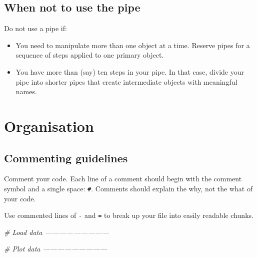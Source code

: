 \documentclass[]{book}
\newenvironment{Shaded}{\begin{snugshade}}{\end{snugshade}}
\newcommand{\CommentTok}[1]{\textcolor[rgb]{0.56,0.35,0.01}{\textit{{#1}}}}
\begin{document}
\section{When not to use the pipe}\label{when-not-to-use-the-pipe}

Do not use a pipe if:

\begin{itemize}
\item
  You need to manipulate more than one object at a time. Reserve pipes
  for a sequence of steps applied to one primary object.
\item
  You have more than (say) ten steps in your pipe. In that case, divide
  your pipe into shorter pipes that create intermediate objects with
  meaningful names.
\end{itemize}

\chapter{Organisation}\label{style-org}

\section{Commenting guidelines}\label{commenting-guidelines}

Comment your code. Each line of a comment should begin with the comment
symbol and a single space: \texttt{\#}. Comments should explain the why,
not the what of your code. 

Use commented lines of \texttt{-} and \texttt{=} to break up your file
into easily readable chunks.

\begin{Shaded}
\begin{Highlighting}[]
\CommentTok{# Load data ---------------------------}

\CommentTok{# Plot data ---------------------------}
\end{Highlighting}
\end{Shaded}
\end{document}

